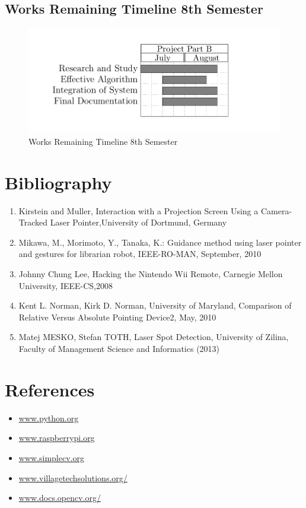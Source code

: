 \documentclass[12pt, a4paper]{article}
\begin{document}
\subsection{Works Remaining Timeline 8th Semester}
\begin{figure}[htp]
\centering
\includegraphics[scale=0.4]{remain8.png}
\caption{Works Remaining Timeline 8th Semester}
\label{}
\end{figure}

\newpage
\section{Bibliography}
\begin{enumerate}
\item Kirstein and Muller, Interaction with a Projection Screen Using a Camera-Tracked Laser Pointer,University of Dortmund, Germany
\item Mikawa, M., Morimoto, Y., Tanaka, K.: Guidance method using laser pointer and gestures for librarian robot, IEEE-RO-MAN, September, 2010
\item Johnny Chung Lee, Hacking the Nintendo Wii Remote, Carnegie Mellon University, IEEE-CS,2008 
\item Kent L. Norman, Kirk D. Norman, University of Maryland, Comparison of Relative Versus Absolute Pointing Device2, May, 2010
\item Matej MESKO, Stefan TOTH, Laser Spot Detection, University of Zilina, Faculty of Management Science and Informatics (2013) 
\end{enumerate}

\newpage
\section{References}
\begin{itemize}
	\item \url{www.python.org}
	\item \url{www.raspberrypi.org}
	\item \url{www.simplecv.org}
	\item \url{www.villagetechsolutions.org/}
	\item \url{www.docs.opencv.org/}
\end{itemize}
\end{document}
